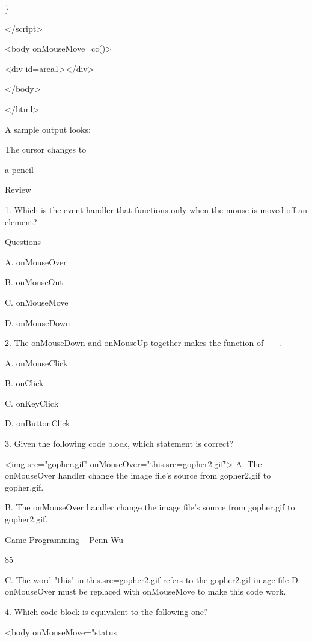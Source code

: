 \documentclass[
]{article}
\begin{document}
\}

\textless/script\textgreater{}

\textless body onMouseMove=cc()\textgreater{}

\textless div id=area1\textgreater\textless/div\textgreater{}

\textless/body\textgreater{}

\textless/html\textgreater{}

A sample output looks:

The cursor changes to

a pencil

Review

1. Which is the event handler that functions only when the mouse is
moved off an element?

Questions

A. onMouseOver

B. onMouseOut

C. onMouseMove

D. onMouseDown

2. The onMouseDown and onMouseUp together makes the function of \_\_.

A. onMouseClick

B. onClick

C. onKeyClick

D. onButtonClick

3. Given the following code block, which statement is correct?

\textless img src="gopher.gif"
onMouseOver="this.src=\textquotesingle gopher2.gif\textquotesingle"\textgreater{}
A. The onMouseOver handler change the image file's source from
gopher2.gif to gopher.gif.

B. The onMouseOver handler change the image file's source from
gopher.gif to gopher2.gif.

Game Programming -- Penn Wu

85

\protect\hypertarget{index_split_006.htmlux5cux23p86}{}{}C. The word
"this" in this.src=\textquotesingle gopher2.gif\textquotesingle{} refers
to the gopher2.gif image file D. onMouseOver must be replaced with
onMouseMove to make this code work.

4. Which code block is equivalent to the following one?

\textless body onMouseMove="status
\end{document}
